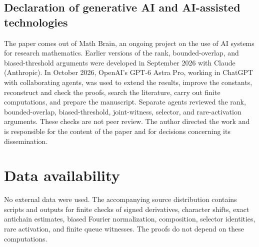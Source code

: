 \documentclass[11pt]{amsart}
\theoremstyle{definition}
\theoremstyle{remark}
\begin{document}
\begin{samepage}
\section*{Declaration of generative AI and AI-assisted technologies}
The paper comes out of Math Brain, an ongoing project on the use of AI systems for research mathematics. Earlier versions of the rank, bounded-overlap, and biased-threshold arguments were developed in September 2026 with Claude (Anthropic). In October 2026, OpenAI's GPT-6 Astra Pro, working in ChatGPT with collaborating agents, was used to extend the results, improve the constants, reconstruct and check the proofs, search the literature, carry out finite computations, and prepare the manuscript. Separate agents reviewed the rank, bounded-overlap, biased-threshold, joint-witness, selector, and rare-activation arguments. These checks are not peer review. The author directed the work and is responsible for the content of the paper and for decisions concerning its dissemination.
\par
\end{samepage}

\section*{Data availability}
No external data were used. The accompanying source distribution contains
scripts and outputs for finite checks of signed derivatives, character
shifts, exact antichain estimates, biased Fourier normalization,
composition, selector identities, rare activation, and finite queue
witnesses. The proofs do not depend on these computations.
\end{document}
